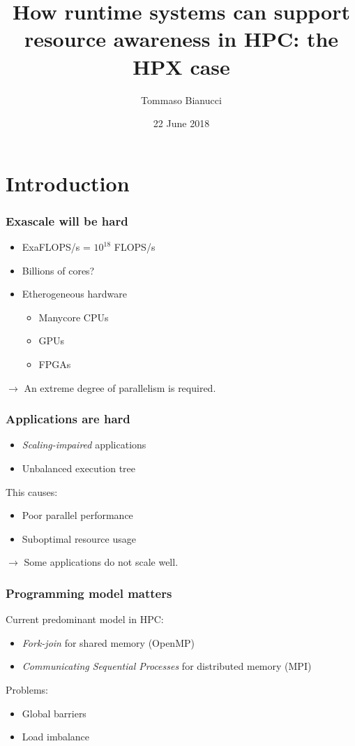 \documentclass[compress]{beamer}
\title[]{How runtime systems can support resource awareness in HPC: the HPX case}
\author{Tommaso Bianucci}
\date{22 June 2018}
\institute{Technische Universität München}
\begin{document}
\begin{frame}
\maketitle
\end{frame}

\section{Introduction}
\begin{frame}
	\frametitle{Exascale will be hard}
	\begin{itemize}
		\item ExaFLOPS/s = $10^{18}$ FLOPS/s
		\item Billions of cores?
		\item Etherogeneous hardware
		\begin{itemize}
			\item Manycore CPUs
			\item GPUs
			\item FPGAs
		\end{itemize}
	\end{itemize}
	\pause
	\vspace{5mm}
	$\longrightarrow$ An extreme degree of parallelism is required.
\end{frame}

\begin{frame}
	\frametitle{Applications are hard}
	\begin{itemize}
		\item \emph{Scaling-impaired} applications
		\item Unbalanced execution tree
	\end{itemize}
	\pause
	This causes:
	\begin{itemize}
		\item Poor parallel performance
		\item Suboptimal resource usage
	\end{itemize}
	\pause
	\vspace{5mm}
	$\longrightarrow$ Some applications do not scale well.
\end{frame}

\begin{frame}
	\frametitle{Programming model matters}
	Current predominant model in HPC:
	\begin{itemize}
		\item \emph{Fork-join} for shared memory (OpenMP)
		\pause
		\item \emph{Communicating Sequential Processes} for distributed memory (MPI)
	\end{itemize}
	\pause
	Problems:
	\begin{itemize}
		\item Global barriers
		\item Load imbalance
	\end{itemize}
\end{frame}
\end{document}
